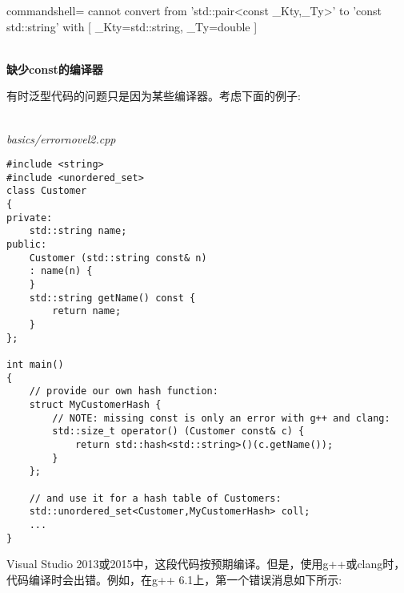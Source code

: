 {\scriptsize
\begin{tcblisting}{commandshell={}}
cannot convert from ’std::pair<const _Kty,_Ty>’ to ’const std::string’
with
[
    _Kty=std::string,
    _Ty=double
]
\end{tcblisting}
}

\hspace*{\fill} \\ %
\noindent
\textbf{缺少const的编译器}

有时泛型代码的问题只是因为某些编译器。考虑下面的例子:

\hspace*{\fill} \\ %
\noindent
\textit{basics/errornovel2.cpp}
\begin{lstlisting}[style=styleCXX]
#include <string>
#include <unordered_set>
class Customer
{
private:
	std::string name;
public:
	Customer (std::string const& n)
	: name(n) {
	}
	std::string getName() const {
		return name;
	}
};

int main()
{
	// provide our own hash function:
	struct MyCustomerHash {
		// NOTE: missing const is only an error with g++ and clang:
		std::size_t operator() (Customer const& c) {
			return std::hash<std::string>()(c.getName());
		}
	};

	// and use it for a hash table of Customers:
	std::unordered_set<Customer,MyCustomerHash> coll;
	...
}
\end{lstlisting}

Visual Studio 2013或2015中，这段代码按预期编译。但是，使用g++或clang时，代码编译时会出错。例如，在g++ 6.1上，第一个错误消息如下所示:

